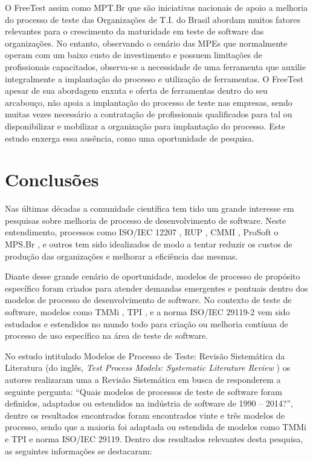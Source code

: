 O FreeTest assim como MPT.Br que são iniciativas nacionais de apoio a melhoria do processo de teste das Organizações de T.I. do Brasil abordam muitos fatores relevantes para o crescimento da maturidade em teste de software das organizações. No entanto, observando o cenário das MPEs que normalmente operam com um baixo custo de investimento e possuem limitações de profissionais capacitados, observa-se a necessidade de uma ferramenta que auxilie integralmente a implantação do processo e utilização de ferramentas. O FreeTest apesar de sua abordagem enxuta e oferta de ferramentas dentro do seu arcabouço, não apoia a implantação do processo de teste nas empresas, sendo muitas vezes necessário a contratação de profissionais qualificados para tal ou disponibilizar e mobilizar a organização para implantação do processo. Este estudo enxerga essa ausência, como uma oportunidade de pesquisa.

\section{Conclusões}
\label{sec:conclusoescap2}

Nas últimas décadas a comunidade científica tem tido um grande interesse em pesquisas sobre melhoria de processo de desenvolvimento de software. Neste entendimento, processos como ISO/IEC 12207 \cite{Mitasiunas2014}, RUP \cite{Veenendaal2012}, CMMI \cite{cmmi}, ProSoft \cite{Mitasiunas2014} o MPS.Br \cite{Softex}, e outros tem sido idealizados de modo a tentar reduzir os custos de produção das organizações e melhorar a eficiência das mesmas.

Diante desse grande cenário de oportunidade, modelos de processo de propósito específico foram criados para atender demandas emergentes e pontuais dentro dos modelos de processo de desenvolvimento de software. No contexto de teste de software, modelos como TMMi \cite{Veenendaal2012}, TPI \cite{Mitasiunas2014}, e a norma ISO/IEC 29119-2 \cite{Standard2013} vem sido estudados e estendidos no mundo todo para criação ou melhoria contínua de processo de uso específico na área de teste de software.

No estudo intitulado Modelos de Processo de Teste: Revisão Sistemática da Literatura (do inglês, \textit{Test Process Models: Systematic Literature Review} \cite{Carlo2010}) os autores realizaram uma a Revisão Sistemática em busca de responderem a seguinte pergunta: “Quais modelos de processos de teste de software foram definidos, adaptados ou estendidos na indústria de software de 1990 – 2014?”, dentre os resultados encontrados foram encontrados vinte e três modelos de processo, sendo que a maioria foi adaptada ou estendida de modelos como TMMi e TPI e norma ISO/IEC 29119. Dentro dos resultados relevantes desta pesquisa, as seguintes informações se destacaram:

